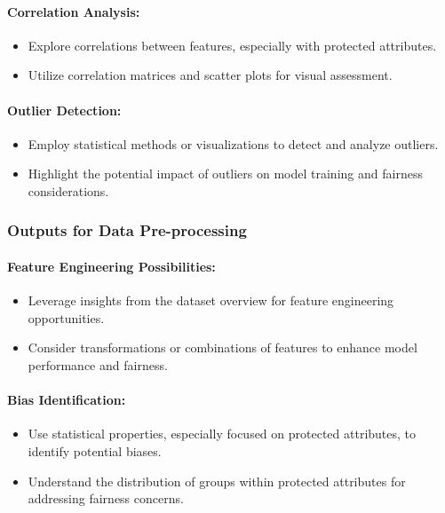 \paragraph{Correlation Analysis:}
\begin{itemize}
    \item Explore correlations between features, especially with protected attributes.
    \item Utilize correlation matrices and scatter plots for visual assessment.
\end{itemize}

\paragraph{Outlier Detection:}
\begin{itemize}
    \item Employ statistical methods or visualizations to detect and analyze outliers.
    \item Highlight the potential impact of outliers on model training and fairness considerations.
\end{itemize}

\subsubsection{Outputs for Data Pre-processing}

\paragraph{Feature Engineering Possibilities:}
\begin{itemize}
    \item Leverage insights from the dataset overview for feature engineering opportunities.
    \item Consider transformations or combinations of features to enhance model performance and fairness.
\end{itemize}

\paragraph{Bias Identification:}
\begin{itemize}
    \item Use statistical properties, especially focused on protected attributes, to identify potential biases.
    \item Understand the distribution of groups within protected attributes for addressing fairness concerns.
\end{itemize}

